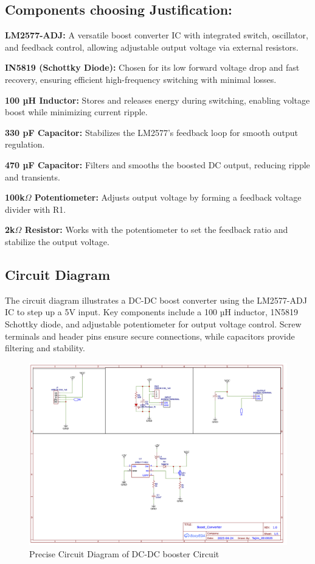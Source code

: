 \documentclass[12pt]{article}
\begin{document}
\subsection*{Components choosing Justification:}
\begin{description}
    \item \textbf{LM2577-ADJ:} A versatile boost converter IC with integrated switch, oscillator, and feedback control, allowing adjustable output voltage via external resistors.
    \item \textbf{IN5819 (Schottky Diode):} Chosen for its low forward voltage drop and fast recovery, ensuring efficient high-frequency switching with minimal losses.
    \item \textbf{100 µH Inductor:} Stores and releases energy during switching, enabling voltage boost while minimizing current ripple.
    \item \textbf{330 pF Capacitor:} Stabilizes the LM2577's feedback loop for smooth output regulation.
    \item \textbf{470 µF Capacitor:} Filters and smooths the boosted DC output, reducing ripple and transients.
    \item \textbf{100k$\Omega$ Potentiometer:} Adjusts output voltage by forming a feedback voltage divider with R1.
    \item \textbf{2k$\Omega$ Resistor:} Works with the potentiometer to set the feedback ratio and stabilize the output voltage.
\end{description}

\subsection*{Circuit Diagram}
The circuit diagram illustrates a DC-DC boost converter using the LM2577-ADJ IC to step up a 5V input. Key components include a 100 µH inductor, 1N5819 Schottky diode, and adjustable potentiometer for output voltage control. Screw terminals and header pins ensure secure connections, while capacitors provide filtering and stability.
\begin{figure}[H]
    \centering
    \includegraphics[width=\textwidth]{booCon.png}
    \caption{Precise Circuit Diagram of DC-DC booster Circuit}
    \label{fig:rControlledNoDelay}
\end{figure}
\end{document}
